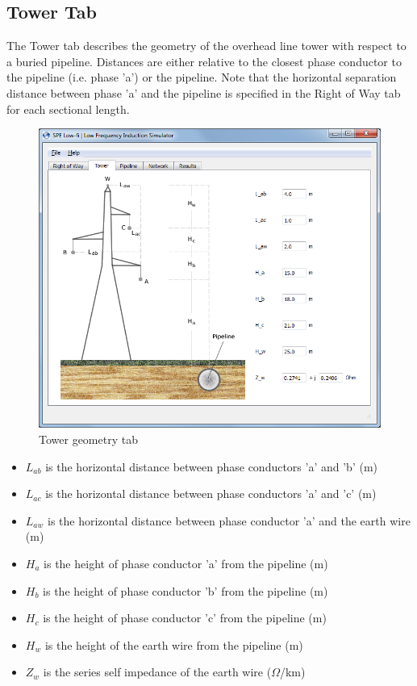 \documentclass{article}
\begin{document}
\subsection{Tower Tab}
The Tower tab describes the geometry of the overhead line tower with respect to a buried pipeline. Distances are either relative to the closest phase conductor to the pipeline (i.e. phase 'a') or the pipeline. Note that the horizontal separation distance between phase 'a' and the pipeline is specified in the Right of Way tab for each sectional length.

\begin{figure}[!htp]
\begin{center}
\caption{Tower geometry tab}
\label{fig:tower}
\includegraphics[width=0.9\linewidth]{./Figures/tower_geometry.png}
\end{center}
\end{figure}

\begin{itemize}
\item $L_{ab}$ is the horizontal distance between phase conductors 'a' and 'b' (m)
\item $L_{ac}$ is the horizontal distance between phase conductors 'a' and 'c' (m)
\item $L_{aw}$ is the horizontal distance between phase conductor 'a' and the earth wire (m)
\item $H_a$ is the height of phase conductor 'a' from the pipeline (m)
\item $H_b$ is the height of phase conductor 'b' from the pipeline (m)
\item $H_c$ is the height of phase conductor 'c' from the pipeline (m)
\item $H_w$ is the height of the earth wire from the pipeline (m)
\item $Z_w$ is the series self impedance of the earth wire ($\Omega$/km)
\end{itemize}
\end{document}
